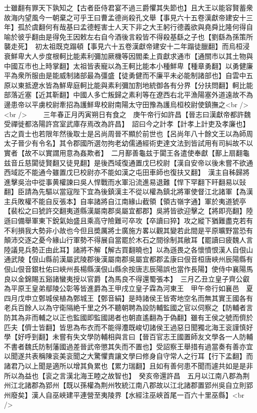 士雖翻有罪天下孰知之【古者臣侍君宴不過三爵懼其失節也】且大王以能容賢蓄衆故海内望風今一朝棄之可乎王曰曹孟德尚殺孔文舉【事見六十五卷漢獻帝建安十三年】孤於虞翻何有哉基曰孟德輕害士人天下非之大王躬行德義欲與堯舜比隆何得自喻於彼乎翻由是得免王因敕左右自今酒後言殺皆不得殺基繇之子也【劉繇為孫策所襲走死】　初太祖既克蹋頓【事見六十五卷漢獻帝建安十二年蹋徒臘翻】而烏桓浸衰鮮卑大人步度根軻比能素利彌加厥機等因閻柔上貢獻求通市【通關市以其土物與中國互市也上時掌翻】太祖皆表寵以為王軻比能本小種鮮卑【種章勇翻】以勇健廉平為衆所服由是能威制諸部最為彊盛【徒勇健而不廉平未必能制諸部也】自雲中五原以東抵遼水皆為鮮卑庭軻比能與素利彌加割地統御各有分界【分扶問翻】軻比能部落近塞【近其靳翻】中國人多亡叛歸之素利等在遼西右北平漁陽塞外道遠故不為邊患帝以平虜校尉牽招為護鮮卑校尉南陽太守田豫為護烏桓校尉使鎮撫之<br />
<br />
　　三年春正月丙寅朔日有食之　庚午帝行如許昌【晉志曰漢獻帝都許魏受禪徙都洛陽許宫室武庫存焉改為許昌】　詔曰今之計孝【計孝上計吏及孝廉也】古之貢士也若限年然後取士是呂尚周晉不顯於前世也【呂尚年八十餘文王以為師周太子晉少有令名】其令郡國所選勿拘老幼儒通經術吏達文法到皆試用有司糾故不以實者【故不以實謂用意為姦欺者】　二月鄯善龜兹于闐王各遣使奉獻【鄯上扇翻龜兹音丘慈闐徒賢翻又徒見翻】是後西域復通置戊巳校尉【漢自安帝以後未嘗不欲通西域訖不能通今雖置戊巳校尉亦不能如漢之屯田車師也復扶又翻】　漢主自秭歸將進擊吳治中從事黄權諫曰吳人悍戰而水軍沿流進易退難【悍下罕翻下旰翻易以䜴翻】臣請為先驅以當寇陛下宜為後鎮漢主不從以權為鎮北將軍使督江北諸軍【為漢主兵敗權不能自反張本】自率諸將自江南緣山截領【領古嶺字通】軍於夷道猇亭【裴松之曰猇許交翻夷道縣漢屬南郡吳屬宜都郡】吳將皆欲迎擊之【將即亮翻】陸遜曰備舉軍東下銳氣始盛且乘高守險難可卒攻【卒讀曰猝】攻之縱下猶難盡克若有不利損我大勢非小故也今但且奬厲將士廣施方畧以觀其變若此間是平原曠野當恐有顛沛交逐之憂今緣山行軍勢不得展自當罷於木石之間徐制其敝耳【罷讀曰疲魏人言陸議見兵勢正由此耳】諸將不解【解古買翻曉也】以為遜畏之各懷憤恨漢人自佷山通武陵【佷山縣前漢屬武陵郡後漢屬南郡吳屬宜都郡孟康曰佷音桓唐峽州辰陽縣有佷山佷音銀杜佑曰峽州長楊縣漢佷山縣余按唐志辰陽誤也當作長陽】使侍中襄陽馬良以金錦賜五谿諸蠻夷授以官爵【為馬良不得還蜀張本】　三月乙丑立皇子齊公叡為平原王皇弟鄢陵公彰等皆進爵為王甲戌立皇子霖為河東王　甲午帝行如襄邑　夏四月戊申立鄄城侯植為鄄城王【鄄音絹】是時諸侯王皆寄地空名而無其實王國各有老兵百餘人以為守衛隔絶千里之外不聽朝聘為設防輔監國之官以伺察之【防輔者言防其為非而輔之以正也監國即監國謁者也朝直遙翻為于偽翻】雖有王侯之號而儕於匹夫【儕士皆翻】皆思為布衣而不能得灋既峻切諸侯王過惡日聞獨北海王衮謹慎好學【好呼到翻】未嘗有失文學防輔相與言曰【晉百官志王國置師友文學各一人防輔不書者魏氏防制藩國過差晉武帝懲其失而不置也】受詔察王舉措有過當奏有善亦宜以聞遂共表稱陳衮美衮聞之大驚懼責讓文學曰修身自守常人之行耳【行下孟翻】而諸君乃以上聞是適所以增其負累也【累力瑞翻】且如有善何患不聞而遽共如是是非所以為益也【衮之言漢北海王睦之故智也】　癸亥帝還許昌　五月以江南八郡為荆州江北諸郡為郢州【既以孫權為荆州牧統江南八郡故以江北諸郡置郢州吳自立則郢州廢矣】漢人自巫峽建平連營至夷陵界【水經注巫峽首尾一百六十里巫縣】<br />

